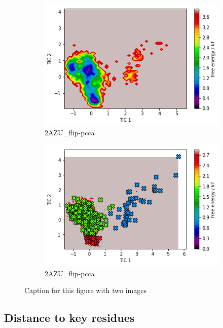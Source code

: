 \documentclass[fleqn,10pt]{wlscirep}
\begin{document}
\begin{figure}[!ht]
\centering
\begin{subfigure}{.5\textwidth}
  \centering
  \includegraphics[width=.9\linewidth]{2AZU_flip/2AZU_flip-tica.png}
  \caption{2AZU_{flip}-pcca}
  \label{fig:2AZU_flip-tica}
\end{subfigure}%
\begin{subfigure}{.5\textwidth}
  \centering
  \includegraphics[width=.9\linewidth]{2AZU_flip/2AZU_flip-pcca.png}
  \caption{2AZU_{flip}-pcca}
  \label{fig:2AZU_flip-pcca}
\end{subfigure}
\caption{Caption for this figure with two images}
\label{fig:2AZU_flip-cluster}
\end{figure}


\subsection{Distance to key residues}
\end{document}
